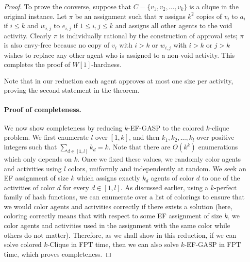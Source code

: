 \begin{proof}
	To prove the converse, suppose that $C = \{v_1, v_2, \dots, v_k\}$ is a clique in the original instance. 
	Let $\pi$ be an assignment such that $\pi$ assigns $k^2$ copies of $v_i$ to $a_i$ if $i \leq k$ and $w_{i,j}$ to $e_{i,j}$ if $1 \leq i,j \leq k$ and assigns all other agents to the void activity. Clearly $\pi$ is individually rational by the construction of approval sets; $\pi$ is also envy-free because no copy of $v_i$ with $i > k$ or $w_{i,j}$ with $i>k$ or $j>k$ wishes to replace any other agent who is assigned to a non-void activity. This completes the proof of $W[1]$-hardness.
	
	Note that in our reduction each agent approves at most one size per activity, proving the second statement in the theorem.

	\paragraph{Proof of completeness.} 
	We now show completeness by reducing $k$-EF-GASP to the colored $k$-clique problem. We first enumerate $l$ over $[1, k]$, and then $k_1, k_2, \dots, k_l$ over positive integers such that $\sum_{d \in [1,l]} k_d = k$. Note that there are $O(k^k)$ enumerations which only depends on $k$. Once we fixed these values, we randomly color agents and activities using $l$ colors, uniformly and independently at random. We seek an EF assignment of size $k$ which assigns exactly $k_d$ agents of color $d$ to one of the activities of color $d$ for every $d\in [1, l]$. As discussed earlier, using a $k$-perfect family of hash functions, we can enumerate over a list of colorings to ensure that we would color agents and activities correctly if there exists a solution (here, coloring correctly means that with respect to some EF assignment of size $k$, we color agents and activities used in the assignment with the same color while others do not matter). Therefore, as we shall show in this reduction, if we can solve colored $k$-Clique in FPT time, then we can also solve $k$-EF-GASP in FPT time, which proves completeness. 
	

\end{proof}

